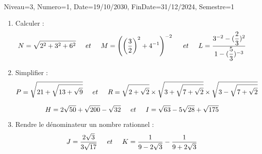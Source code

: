 \documentclass[a4paper,12pt]{article}
\begin{document}
\begin{Maquette}[DM]{Niveau=3, Numero=1, Date=19/10/2030, FinDate=31/12/2024, Semestre=1}
\begin{exercice}
\begin{enumerate}
\item Calculer :
\[
N=\sqrt{2^{2}+3^{2}+6^{2}}\hspace*{0.5cm}et\hspace*{0.5cm}
M=\left( \left( \dfrac{3}{2}\right)^{2}+4^{-1}\right)^{-2}  \hspace*{0.5cm}et\hspace*{0.5cm}
L=\dfrac{3^{-2}-(\dfrac{2}{3})^{2}}{1-(\dfrac{5}{3})^{-3}}
\]
\item Simplifier :
\[
P=\sqrt{21+\sqrt{13+\sqrt{9}}}\hspace*{0.5cm}et\hspace*{0.5cm}
R=\sqrt{2+\sqrt{2}}\times \sqrt{3+\sqrt{7+\sqrt{2}}}\times \sqrt{3-\sqrt{7+\sqrt{2}}}
\]

\[
H=2\sqrt{50}+\sqrt{200}-\sqrt{32}\hspace*{0.5 cm}et\hspace*{0.5 cm}
I=\sqrt{63}-5\sqrt{28}+\sqrt{175}
\]
\item Rendre le dénominateur un nombre rationnel :
\[
J=\dfrac{2\sqrt{3}}{3\sqrt{17}}\hspace*{0.5 cm}et\hspace*{0.5 cm}
K=\dfrac{1}{9-2\sqrt{3}}-\dfrac{1}{9+2\sqrt{3}}
\]
\end{enumerate}
\end{exercice}

\end{Maquette}
\end{document}
